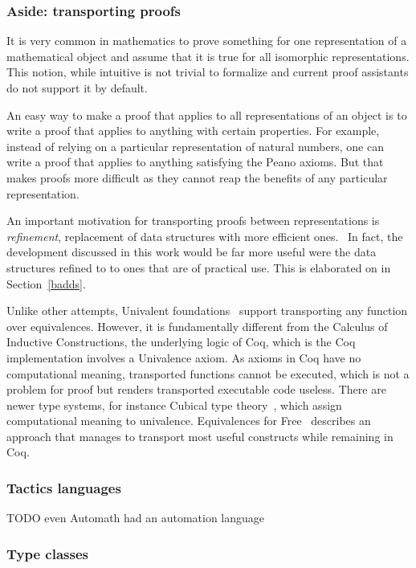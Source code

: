 \documentclass[english, 12pt, a4paper, sci, a-1b, online]{aaltothesis}
\begin{document}
\subsubsection{Aside: transporting proofs}

It is very common in mathematics to prove something for one representation of a mathematical object and assume that it is true for all isomorphic representations. This notion, while intuitive is not trivial to formalize and current proof assistants do not support it by default.

An easy way to make a proof that applies to all representations of an object is to write a proof that applies to anything with certain properties. For example, instead of relying on a particular representation of natural numbers, one can write a proof that applies to anything satisfying the Peano axioms. But that makes proofs more difficult as they cannot reap the benefits of any particular representation.~\cite{transferAlongIso}

An important motivation for transporting proofs between representations is \emph{refinement}, replacement of data structures with more efficient ones.~\cite{refinementsFF} In fact, the development discussed in this work would be far more useful were the data structures refined to to ones that are of practical use. This is elaborated on in Section~\ref{badds}.

Unlike other attempts, Univalent foundations~\cite{hottbook} support transporting any function over equivalences. However, it is fundamentally different from the Calculus of Inductive Constructions, the underlying logic of Coq, which is the Coq implementation involves a Univalence axiom. As axioms in Coq have no computational meaning, transported functions cannot be executed, which is not a problem for proof but renders transported executable code useless. There are newer type systems, for instance Cubical type theory~\cite{cubicalTT}, which assign computational meaning to univalence. Equivalences for Free~\cite{equivalencesFF} describes an approach that manages to transport most useful constructs while remaining in Coq.

\subsubsection{Tactics languages}

TODO even Automath had an automation language

\subsubsection{Type classes}
\end{document}

